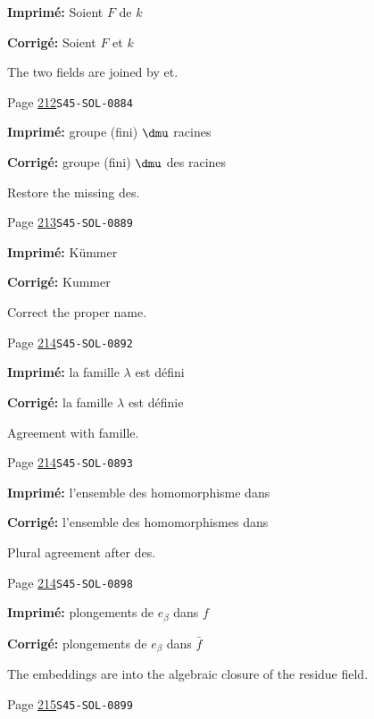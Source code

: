 \begin{description}
\par\noindent\textbf{Imprimé:} Soient $F$ de $k$
\par\noindent\textbf{Corrigé:} Soient $F$ et $k$
\par\noindent The two fields are joined by et.
\smallskip
\item[\hypertarget{apparatus:FR-0217}{217}] Page \hyperlink{printpage:fr:212}{212}\quad\texttt{S45-SOL-0884}
\par\noindent\textbf{Imprimé:} groupe (fini) $\dmu$ racines
\par\noindent\textbf{Corrigé:} groupe (fini) $\dmu$ des racines
\par\noindent Restore the missing des.
\smallskip
\item[\hypertarget{apparatus:FR-0218}{218}] Page \hyperlink{printpage:fr:213}{213}\quad\texttt{S45-SOL-0889}
\par\noindent\textbf{Imprimé:} K\"ummer
\par\noindent\textbf{Corrigé:} Kummer
\par\noindent Correct the proper name.
\smallskip
\item[\hypertarget{apparatus:FR-0219}{219}] Page \hyperlink{printpage:fr:214}{214}\quad\texttt{S45-SOL-0892}
\par\noindent\textbf{Imprimé:} la famille $\lambda$ est défini
\par\noindent\textbf{Corrigé:} la famille $\lambda$ est définie
\par\noindent Agreement with famille.
\smallskip
\item[\hypertarget{apparatus:FR-0220}{220}] Page \hyperlink{printpage:fr:214}{214}\quad\texttt{S45-SOL-0893}
\par\noindent\textbf{Imprimé:} l'ensemble des homomorphisme dans
\par\noindent\textbf{Corrigé:} l'ensemble des homomorphismes dans
\par\noindent Plural agreement after des.
\smallskip
\item[\hypertarget{apparatus:FR-0221}{221}] Page \hyperlink{printpage:fr:214}{214}\quad\texttt{S45-SOL-0898}
\par\noindent\textbf{Imprimé:} plongements de $e_\beta$ dans $f$
\par\noindent\textbf{Corrigé:} plongements de $e_\beta$ dans $\bar f$
\par\noindent The embeddings are into the algebraic closure of the residue field.
\smallskip
\item[\hypertarget{apparatus:FR-0222}{222}] Page \hyperlink{printpage:fr:215}{215}\quad\texttt{S45-SOL-0899}

\end{description}
